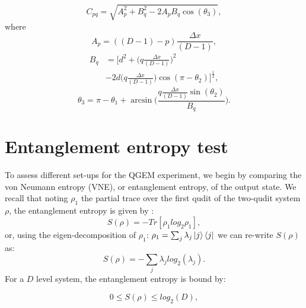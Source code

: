 \documentclass[%
 reprint,
 superscriptaddress,
 amsmath,
 amssymb,
 aps,
 longbibliography
]{revtex4-2}
\begin{document}
            \begin{equation}
			    C_{pq} = \sqrt{A_p^2 + B_q^2 - 2A_pB_q\cos(\theta_3)},
		    \end{equation}	
		    where
			\begin{equation}
			    A_p = ((D-1) - p)\frac{\Delta x}{(D - 1)},
		    \end{equation}
			\begin{align}
			    B_q &= [d^2 + \bigg(q\frac{\Delta x}{(D - 1)}\bigg)^2 \nonumber \\
			    &- 2d\bigg(q\frac{\Delta x}{(D - 1)}\bigg)\cos{(\pi -\theta_2)}]^{\frac{1}{2}},
		    \end{align}
			\begin{equation}
			    \theta_3 = \pi - \theta_1 +\arcsin{\bigg(\frac{q\frac{\Delta x}{(D - 1)}\sin(\theta_2)}{B_q}\bigg)}.
		    \end{equation}


\section{Entanglement entropy test \label{sec:VNE}}

\indent To assess different set-ups for the QGEM experiment, we begin by comparing the von Neumann entropy (VNE), or entanglement entropy, of the output state. We recall that noting $\rho_1$ the partial trace over the first qudit of the two-qudit system $\rho$, the entanglement entropy is given by \cite{Bengtsson_book}:
		\begin{equation}
			S(\rho) = -Tr[\rho_1log_2\rho_1],
		\end{equation}
or, using the eigen-decomposition of $\rho_1$: $\rho_1=\sum_{j}\lambda_j \Ket{j}\Bra{j}$ we can re-write $S(\rho)$ as:
		\begin{equation} \label{VNEformula}
			S(\rho) = -\sum_{j}\lambda_j log_2(\lambda_j).
		\end{equation}
\indent For a $D$ level system, the entanglement entropy is bound by:

		\begin{equation} \label{VQE_bounds}
			0\leq S(\rho) \leq log_2 (D),
		\end{equation}
		
\end{document}
